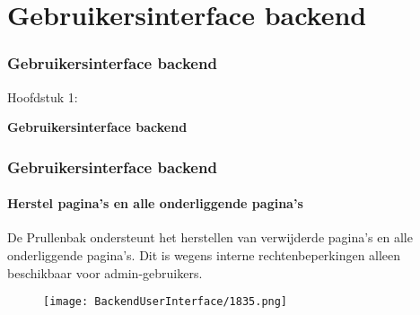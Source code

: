 %

\section{Gebruikersinterface backend}
\begin{frame}[fragile]
	\frametitle{Gebruikersinterface backend}

	\begin{center}\huge{Hoofdstuk 1:}\end{center}
	\begin{center}\huge{\color{typo3darkgrey}\textbf{Gebruikersinterface backend}}\end{center}

\end{frame}

\begin{frame}[fragile]
	\frametitle{Gebruikersinterface backend}
	\framesubtitle{Herstel pagina's en alle onderliggende pagina's}

	De Prullenbak ondersteunt het herstellen van verwijderde pagina's en alle onderliggende
	pagina's.
	Dit is wegens interne rechtenbeperkingen alleen beschikbaar voor admin-gebruikers.

	\begin{figure}
		\texttt{[image: BackendUserInterface/1835.png]}
	\end{figure}

\end{frame}

